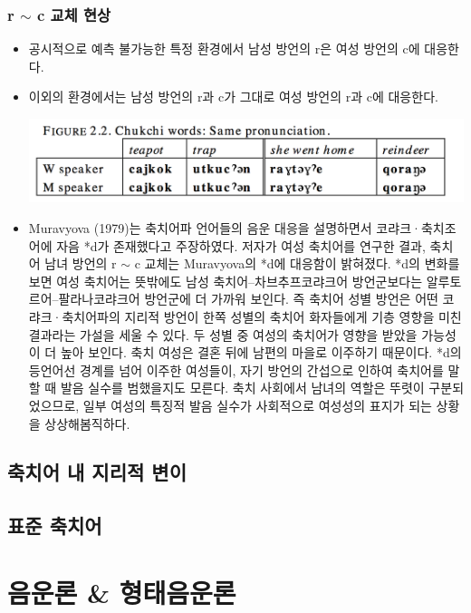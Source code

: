 \subsubsection{r $\sim$ c 교체 현상}
\begin{itemize}
\item 공시적으로 예측 불가능한 특정 환경에서 남성 방언의 r은 여성 방언의 c에 대응한다. 
\item 이외의 환경에서는 남성 방언의 r과 c가 그대로 여성 방언의 r과 c에 대응한다.
\begin{center}
\includegraphics[width=.8\linewidth]{Chukchi/src/Chukchi-rc}
\end{center}
\item Muravyova (1979)는 축치어파 언어들의 음운 대응을 설명하면서 코랴크·축치조어에 자음 *d가 존재했다고 주장하였다. 저자가 여성 축치어를 연구한 결과, 축치어 남녀 방언의 r $\sim$ c 교체는 Muravyova의 *d에 대응함이 밝혀졌다. *d의 변화를 보면 여성 축치어는 뜻밖에도 남성 축치어--차브추프코랴크어 방언군보다는 알루토르어--팔라나코랴크어 방언군에 더 가까워 보인다. 즉 축치어 성별 방언은 어떤 코랴크·축치어파의 지리적 방언이 한쪽 성별의 축치어 화자들에게 기층 영향을 미친 결과라는 가설을 세울 수 있다. 두 성별 중 여성의 축치어가 영향을 받았을 가능성이 더 높아 보인다. 축치 여성은 결혼 뒤에 남편의 마을로 이주하기 때문이다. *d의 등언어선 경계를 넘어 이주한 여성들이, 자기 방언의 간섭으로 인하여 축치어를 말할 때 발음 실수를 범했을지도 모른다. 축치 사회에서 남녀의 역할은 뚜렷이 구분되었으므로, 일부 여성의 특징적 발음 실수가 사회적으로 여성성의 표지가 되는 상황을 상상해봄직하다.
\end{itemize}

\subsection{축치어 내 지리적 변이}
\omission
\subsection{표준 축치어}
\omission

\section{음운론 \& 형태음운론}
